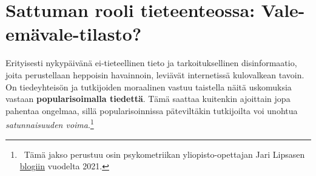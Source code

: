 \documentclass[
]{book}
\begin{document}
\hypertarget{alaluku46}{%
\section{Sattuman rooli tieteenteossa: Vale-emävale-tilasto?}\label{alaluku46}}

Erityisesti nykypäivänä ei-tieteellinen tieto ja tarkoituksellinen disinformaatio, joita perustellaan heppoisin havainnoin, leviävät internetissä kulovalkean tavoin. On tiedeyhteisön ja tutkijoiden moraalinen vastuu taistella näitä uskomuksia vastaan \textbf{popularisoimalla tiedettä}. Tämä saattaa kuitenkin ajoittain jopa pahentaa ongelmaa, sillä popularisoinnissa päteviltäkin tutkijoilta voi unohtua \emph{satunnaisuuden voima}.\footnote{~Tämä jakso perustuu osin psykometriikan yliopisto-opettajan Jari Lipsasen \href{https://blogs.helsinki.fi/med-viikonjuttu/2021/02/22/vale-emavale-tilasto}{blogiin} vuodelta 2021.}
\end{document}
